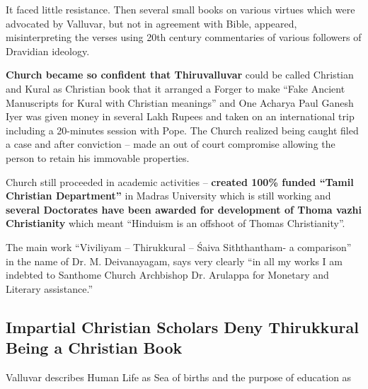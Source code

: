 It faced little resistance. Then several small books on various virtues which were advocated by Valluvar, but not in agreement with Bible, appeared, misinterpreting the verses using 20th century commentaries of various followers of Dravidian ideology.

\textbf{Church became so confident that Thiruvalluvar} could be called Christian and Kural as Christian book that it arranged a Forger to make “Fake Ancient Manuscripts for Kural with Christian meanings” and One Acharya Paul Ganesh Iyer was given money in several Lakh Rupees and taken on an international trip including a 20-minutes session with Pope. The Church realized being caught filed a case and after conviction – made an out of court compromise allowing the person to retain his immovable properties.

Church still proceeded in academic activities – \textbf{created 100\% funded “Tamil Christian Department”} in Madras University which is still working and \textbf{several Doctorates have been awarded for development of Thoma vazhi Christianity} which meant “Hinduism is an offshoot of Thomas Christianity”.

The main work “Viviliyam – Thirukkural – Śaiva Siththantham- a comparison” in the name of Dr. M. Deivanayagam, says very clearly “in all my works I am indebted to Santhome Church Archbishop Dr. Arulappa for Monetary and Literary assistance.”

\subsection*{Impartial Christian Scholars Deny Thirukkural Being a Christian Book}

Valluvar describes Human Life as Sea of births and the purpose of education as


